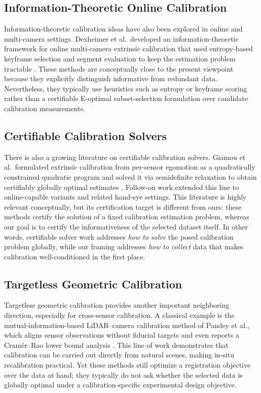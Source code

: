 \documentclass[11pt]{article}
\begin{document}
\subsection{Information-Theoretic Online Calibration}
Information-theoretic calibration ideas have also been explored in online and
multi-camera settings.
Dexheimer et al.\ developed an information-theoretic framework for online
multi-camera extrinsic calibration that used entropy-based keyframe selection
and segment evaluation to keep the estimation problem tractable
\citep{dexheimer2022information}.
These methods are conceptually close to the present viewpoint because they
explicitly distinguish informative from redundant data.
Nevertheless, they typically use heuristics such as entropy or keyframe
scoring rather than a certifiable E-optimal subset-selection formulation over
candidate calibration measurements.

\subsection{Certifiable Calibration Solvers}
There is also a growing literature on certifiable calibration solvers.
Giamou et al.\ formulated extrinsic calibration from per-sensor egomotion as
a quadratically constrained quadratic program and solved it via semidefinite
relaxation to obtain certifiably globally optimal estimates
\citep{giamou2019certifiable}.
Follow-on work extended this line to online-capable variants and related
hand-eye settings.
This literature is highly relevant conceptually, but its certification target
is different from ours: these methods certify the solution of a fixed
calibration estimation problem, whereas our goal is to certify the
informativeness of the selected dataset itself.
In other words, certifiable solver work addresses \emph{how to solve} the
posed calibration problem globally, while our framing addresses \emph{how to
collect} data that makes calibration well-conditioned in the first place.

\subsection{Targetless Geometric Calibration}
Targetless geometric calibration provides another important neighboring
direction, especially for cross-sensor calibration.
A classical example is the mutual-information-based LiDAR--camera calibration
method of Pandey et al., which aligns sensor observations without fiducial
targets and even reports a Cram\'er--Rao lower bound analysis
\citep{pandey2015mutual}.
This line of work demonstrates that calibration can be carried out directly
from natural scenes, making in-situ recalibration practical.
Yet these methods still optimize a registration objective over the data at
hand; they typically do not ask whether the selected data is globally optimal
under a calibration-specific experimental design objective.
\end{document}
